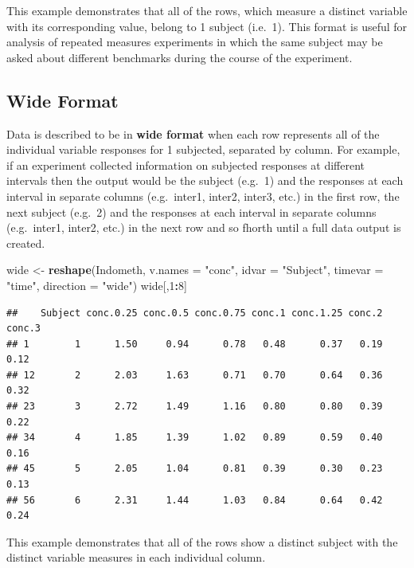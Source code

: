 \documentclass[]{book}
\newenvironment{Shaded}{\begin{snugshade}}{\end{snugshade}}
\newcommand{\DataTypeTok}[1]{\textcolor[rgb]{0.13,0.29,0.53}{#1}}
\newcommand{\DecValTok}[1]{\textcolor[rgb]{0.00,0.00,0.81}{#1}}
\newcommand{\KeywordTok}[1]{\textcolor[rgb]{0.13,0.29,0.53}{\textbf{#1}}}
\newcommand{\NormalTok}[1]{#1}
\newcommand{\OperatorTok}[1]{\textcolor[rgb]{0.81,0.36,0.00}{\textbf{#1}}}
\newcommand{\StringTok}[1]{\textcolor[rgb]{0.31,0.60,0.02}{#1}}
\begin{document}
This example demonstrates that all of the rows, which measure a distinct variable with its corresponding value, belong to 1 subject (i.e.~1). This format is useful for analysis of repeated measures experiments in which the same subject may be asked about different benchmarks during the course of the experiment.

\hypertarget{wide-format}{%
\subsection{Wide Format}\label{wide-format}}

Data is described to be in \textbf{wide format} when each row represents all of the individual variable responses for 1 subjected, separated by column. For example, if an experiment collected information on subjected responses at different intervals then the output would be the subject (e.g.~1) and the responses at each interval in separate columns (e.g.~inter1, inter2, inter3, etc.) in the first row, the next subject (e.g.~2) and the responses at each interval in separate columns (e.g.~inter1, inter2, etc.) in the next row and so fhorth until a full data output is created.

\begin{Shaded}
\begin{Highlighting}[]
\NormalTok{wide <-}\StringTok{ }\KeywordTok{reshape}\NormalTok{(Indometh, }\DataTypeTok{v.names =} \StringTok{"conc"}\NormalTok{, }\DataTypeTok{idvar =} \StringTok{"Subject"}\NormalTok{,}
                \DataTypeTok{timevar =} \StringTok{"time"}\NormalTok{, }\DataTypeTok{direction =} \StringTok{"wide"}\NormalTok{)}
\NormalTok{wide[,}\DecValTok{1}\OperatorTok{:}\DecValTok{8}\NormalTok{]}
\end{Highlighting}
\end{Shaded}

\begin{verbatim}
##    Subject conc.0.25 conc.0.5 conc.0.75 conc.1 conc.1.25 conc.2 conc.3
## 1        1      1.50     0.94      0.78   0.48      0.37   0.19   0.12
## 12       2      2.03     1.63      0.71   0.70      0.64   0.36   0.32
## 23       3      2.72     1.49      1.16   0.80      0.80   0.39   0.22
## 34       4      1.85     1.39      1.02   0.89      0.59   0.40   0.16
## 45       5      2.05     1.04      0.81   0.39      0.30   0.23   0.13
## 56       6      2.31     1.44      1.03   0.84      0.64   0.42   0.24
\end{verbatim}

This example demonstrates that all of the rows show a distinct subject with the distinct variable measures in each individual column.
\end{document}

